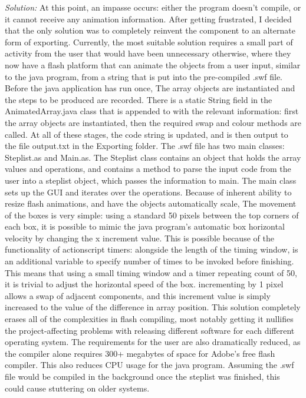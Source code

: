 \documentclass{l3proj}
\begin{document}
\begin{itemize}
\textit{Solution:}
	At this point, an impasse occurs: either the program doesn’t compile, or it cannot receive any animation information. After getting frustrated, I decided that the only solution was to completely reinvent the component to an alternate form of exporting. Currently, the most suitable solution requires a small part of activity from the user that would have been unnecessary otherwise, where they now have a flash platform that can animate the objects from a user input, similar to the java program, from a string that is put into the pre-compiled .swf file.
	Before the java application has run once, The array objects are instantiated and the steps to be produced are recorded. There is a static String field in the AnimatedArray.java class that is appended to with the relevant information: first the array objects are instantiated, then the required swap and colour methods are called. At all of these stages, the code string is updated, and is then output to the file output.txt in the Exporting folder.
	The .swf file has two main classes: Steplist.as and Main.as. The Steplist class contains an object that holds the array values and operations, and contains a method to parse the input code from the user into a steplist object, which passes the information to main. The main class sets up the GUI and iterates over the operations. Because of inherent ability to resize flash animations, and have the objects automatically scale, The movement of the boxes is very simple: using a standard 50 pixels between the top corners of each box, it is possible to mimic the java program’s automatic box horizontal velocity by changing the x increment value. This is possible because of the functionality of actionscript timers: alongside the length of the timing window, is an additional variable to specify number of times to be invoked before finishing. This means that using a small timing window and a timer repeating count of 50, it is trivial to adjust the horizontal speed of the box. incrementing by 1 pixel allows a swap of adjacent components, and this increment value is simply increased to the value of the difference in array position.
	This solution completely erases all of the complexities in flash compiling, most notably getting it nullifies the project-affecting problems with releasing different software for each different operating system. The requirements for the user are also dramatically reduced, as the compiler alone requires 300+ megabytes of space for Adobe’s free flash compiler. This also reduces CPU usage for the java program. Assuming the .swf file would be compiled in the background once the steplist was finished, this could cause stuttering on older systems. 
\end{itemize}
\end{document}
